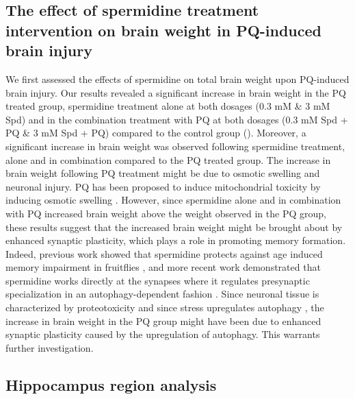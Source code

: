 \subsection{The effect of spermidine treatment intervention on brain weight in PQ-induced brain injury}
We first assessed the effects of spermidine on total brain weight upon PQ-induced brain injury. Our results revealed a significant increase in brain weight in the PQ treated group, spermidine treatment alone at both dosages (0.3 mM \& 3 mM Spd) and in the combination treatment with PQ at both dosages (0.3 mM Spd + PQ \& 3 mM Spd + PQ) compared to the control group (). Moreover, a significant increase in brain weight was observed following spermidine treatment, alone and in combination compared to the PQ treated group. The increase in brain weight following PQ treatment might be due to osmotic swelling and neuronal injury. PQ has been proposed to induce mitochondrial toxicity by inducing osmotic swelling \citep{Cappelletti1996,Mohammadi-Bardbori2008}. However, since spermidine alone and in combination with PQ increased brain weight above the weight observed in the PQ group, these results suggest that the increased brain weight might be brought about by enhanced synaptic plasticity, which plays a role in promoting memory formation. Indeed, previous work showed that spermidine protects against age induced memory impairment in fruitflies \citep{Gupta2016,Gupta2013,Sigrist2014}, and more recent work demonstrated that spermidine works directly at the synapses where it regulates presynaptic specialization in an autophagy-dependent fashion \citep{Bhukel2017}. Since neuronal tissue is characterized by proteotoxicity and since stress upregulates autophagy \citep{Petrovski2011,Yorimitsu2006}, the increase in brain weight in the PQ group might have been due to enhanced synaptic plasticity caused by the upregulation of autophagy. This warrants further investigation. 

\subsection{Hippocampus region analysis} 
